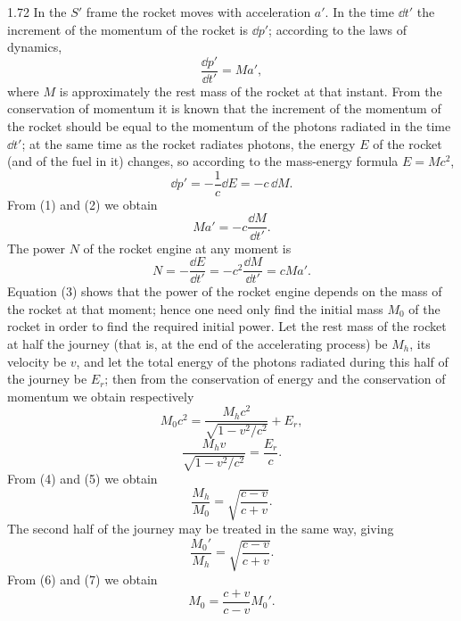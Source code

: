 \begin{solution}{1.72}
In the $S'$ frame the rocket moves with acceleration $a'$. In the time $\dd t'$ the increment of the momentum of the rocket is $\dd p'$; according to the laws of dynamics,
\begin{equation}
\frac{\dd p'}{\dd t'}=Ma', \tag{1}
\end{equation}
where $M$ is approximately the rest mass of the rocket at that instant. From the conservation of momentum it is known that the increment of the momentum of the rocket should be equal to the momentum of the photons radiated in the time $\dd t'$; at the same time as the rocket radiates photons, the energy $E$ of the rocket (and of the fuel in it) changes, so according to the mass-energy formula $E=Mc^2$,
\begin{equation}
\dd p'=-\frac{1}{c}\dd E=-c\,\dd M. \tag{2}
\end{equation}
From (1) and (2) we obtain
\[
Ma'=-c\frac{\dd M}{\dd t'}.
\]
The power $N$ of the rocket engine at any moment is
\begin{equation}
N=-\frac{\dd E}{\dd t'}=-c^2\frac{\dd M}{\dd t'}=cMa'. \tag{3}
\end{equation}
Equation (3) shows that the power of the rocket engine depends on the mass of the rocket at that moment; hence one need only find the initial mass $M_0$ of the rocket in order to find the required initial power. Let the rest mass of the rocket at half the journey (that is, at the end of the accelerating process) be $M_h$, its velocity be $v$, and let the total energy of the photons radiated during this half of the journey be $E_r$; then from the conservation of energy and the conservation of momentum we obtain respectively
\begin{equation}
M_0c^2=\frac{M_hc^2}{\sqrt{1-v^2/c^2}}+E_r, \tag{4}
\end{equation}
\begin{equation}
\frac{M_hv}{\sqrt{1-v^2/c^2}}=\frac{E_r}{c}. \tag{5}
\end{equation}
From (4) and (5) we obtain
\begin{equation}
\frac{M_h}{M_0}=\sqrt{\frac{c-v}{c+v}}. \tag{6}
\end{equation}
The second half of the journey may be treated in the same way, giving
\begin{equation}
\frac{M_0'}{M_h}=\sqrt{\frac{c-v}{c+v}}. \tag{7}
\end{equation}
From (6) and (7) we obtain
\begin{equation}
M_0=\frac{c+v}{c-v}M_0'. \tag{8}
\end{equation}

\end{solution}
